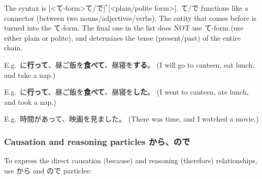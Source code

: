 \documentclass[../nihongo-gakushuu-kyouzai.tex]{subfiles}
\begin{document}
The syntax is [<て-form>て/で]$^*$[<plain/polite form>]. て/で functions like a connector (between two nouns/adjectives/verbs). The entity that comes before is turned into the て-form. The final one in the list does NOT use て-form (use either plain or polite), and determines the tense (present/past) of the entire chain.

E.g.\ に\textbf{行って}、昼ご飯を\textbf{食べて}、昼寝を\textbf{する}。 (I will go to canteen, eat lunch, and take a nap.)

E.g.\ に\textbf{行って}、昼ご飯を\textbf{食べて}、昼寝を\textbf{した}。 (I went to canteen, ate lunch, and took a nap.)

E.g.\ 時間があって、映画を見ました。 (There was time, and I watched a movie.)

\subsubsection{Causation and reasoning particles から、ので} \label{sec:causation-reasoning-particles}
To express the direct causation (because) and reasoning (therefore) relationships, use から and ので particles:
\end{document}
